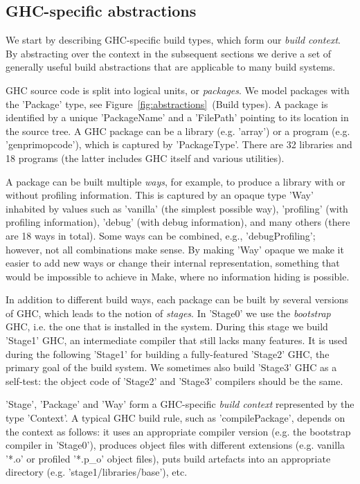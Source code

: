 \subsection{GHC-specific abstractions\label{sec:ghc-context}}

We start by describing GHC-specific build types, which form our \emph{build
context}. By abstracting over the context in the subsequent sections we derive a
set of generally useful build abstractions that are applicable to many build
systems.

GHC source code is split into logical units, or \emph{packages}. We model
packages with the \lst'Package' type, see
Figure~\ref{fig:abstractions}~(Build types). A package is identified by a
unique \lst'PackageName' and a \lst'FilePath' pointing to its location in the
source tree. A GHC package can be a library (e.g. \lst'array') or a program
(e.g. \lst'genprimopcode'), which is captured by \lst'PackageType'. There are
32 libraries and 18 programs (the latter includes GHC itself and various utilities).

A package can be built multiple \emph{ways}, for example, to produce a library
with or without profiling information. This is captured by an opaque
type \lst'Way' inhabited by values such as \lst'vanilla' (the simplest
possible way), \lst'profiling' (with profiling information), \lst'debug'
(with debug information), and many others (there are 18 ways in total). Some
ways can be combined, e.g., \lst'debugProfiling'; however, not all combinations
make sense. By making \lst'Way' opaque we make it easier
to add new ways or change their internal representation, something that would be
impossible to achieve in Make, where no information hiding is possible.

In addition to different build ways, each package can be built by several
versions of GHC, which leads to the notion of \emph{stages}.
In \lst'Stage0' we use the \emph{bootstrap} GHC, i.e. the one that is
installed in the system. During this stage we build \lst'Stage1' GHC, an
intermediate compiler that still lacks many features. It is used during the
following \lst'Stage1' for building a fully-featured \lst'Stage2' GHC, the
primary goal of the build system. We sometimes also build \lst'Stage3' GHC as
a self-test: the object code of \lst'Stage2' and \lst'Stage3' compilers
should be the same.

\lst'Stage', \lst'Package' and \lst'Way' form a GHC-specific
\emph{build context} represented by the type \lst'Context'. A typical GHC build
rule, such as \lst'compilePackage', depends on the context as follows: it
uses an appropriate compiler version (e.g. the bootstrap compiler in
\lst'Stage0'), produces object files with different extensions (e.g. vanilla
\lst'*.o' or profiled \lst'*.p_o' object files), puts build artefacts
into an appropriate directory (e.g. \lst'stage1/libraries/base'), etc.

